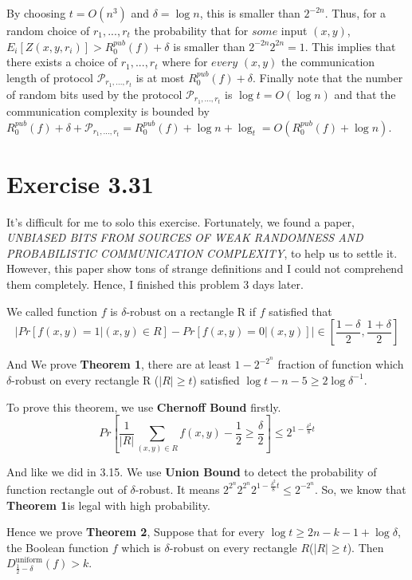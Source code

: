 \documentclass[11pt, fleqn, a4paper]{report}
\begin{document}
By choosing $t = O(n^3)$ and $\delta = \log{n}$, this is smaller than $2^{-2n}$. Thus, for a random choice of $r_1,...,r_t$ the probability that for $some$ input $(x,y)$, $E_i[Z(x,y,r_i)] > R_0^{pub}(f) + \delta$ is smaller than $2^{-2n}2^{2n} = 1$. This implies that there exists a choice of $r_1,...,r_t$ where for $every$ $(x,y)$ the communication length of protocol $\mathcal{P}_{r_1,...,r_t}$ is at most $R_0^{pub}(f) + \delta$. Finally note that the number of random bits used by the protocol $\mathcal{P}_{r_1,...,r_t}$ is $\log{t} = O(\log{n})$ and that the communication complexity is bounded by $R_0^{pub}(f) + \delta + \mathcal{P}_{r_1,...,r_t} = R_0^{pub}(f) + \log{n} + \log_{t} = O(R_0^{pub}(f) + \log{n})$.

\section*{Exercise 3.31}

It's difficult for me to solo this exercise. Fortunately, we found a paper, \emph{UNBIASED BITS FROM SOURCES OF WEAK RANDOMNESS AND PROBABILISTIC COMMUNICATION COMPLEXITY}, to help us to settle it. However, this paper show tons of strange definitions and I could not comprehend them completely. Hence, I finished this problem 3 days later.

We called function $f$ is $\delta$-robust on a rectangle R if $f$ satisfied that
$$\mid Pr[f(x,y) = 1 | (x,y) \in R]  - Pr[f(x, y) = 0 | (x,y)] \mid \in [\frac{1-\delta}{2}, \frac{1+\delta}{2}]$$

And We prove \textbf{Theorem 1}, there are at least $1 - 2^{-2^n}$ fraction of function which $\delta$-robust on every rectangle R ($\mid R \mid \geq t$) satisfied $\log{t} - n - 5 \geq 2\log{\delta^{-1}}$.

To prove this theorem, we use \textbf{Chernoff Bound} firstly.
$$Pr[ \frac{1}{|R|} \sum_{(x,y)\in R}{f(x,y) - \frac{1}{2}} \geq \frac{\delta}{2} ] \leq 2^{1 - \frac{\delta^2}{8}t}$$

And like we did in 3.15. We use \textbf{Union Bound} to detect the probability of function rectangle out of $\delta$-robust. It means $2^{2^n} 2^{2^n} 2^{1 - \frac{\delta^2}{8}t} \leq 2^{-2^n}$. So, we know that \textbf{Theorem 1}is legal with high probability.

Hence we prove \textbf{Theorem 2}, Suppose that for every $\log{t} \geq 2n - k - 1 + \log{\delta}$, the Boolean function $f$ which is $\delta$-robust on every rectangle $R$($\mid R \mid \geq t$). Then $D_{\frac{1}{2} - \delta}^{\mathrm{uniform}}(f) > k$.
\end{document}
